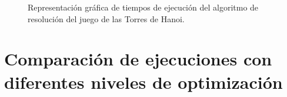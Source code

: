 \documentclass{homework}
\begin{document}
    \begin{figure}[H]
        \centering


        \caption{Representación gráfica de tiempos de ejecución del algoritmo de resolución del juego de las Torres de Hanoi.}

        \label{emp:hanoi}
    \end{figure}

    \section{Comparación de ejecuciones con diferentes niveles de optimización}
\end{document}
